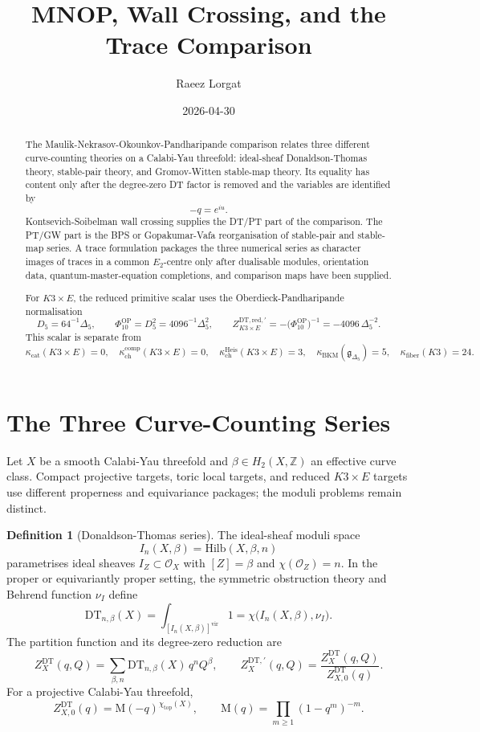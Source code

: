 \documentclass[11pt]{article}
\title{MNOP, Wall Crossing, and the Trace Comparison}
\author{Raeez Lorgat}
\date{2026-04-30}
\theoremstyle{definition}
\newtheorem{definition}[theorem]{Definition}
\providecommand{\Z}{\mathbb{Z}}
\providecommand{\cO}{\mathcal{O}}
\providecommand{\fg}{\mathfrak{g}}
\providecommand{\Hilb}{\mathrm{Hilb}}
\providecommand{\DT}{\mathrm{DT}}
\providecommand{\MM}{\mathrm{M}}
\providecommand{\vir}{\mathrm{vir}}
\providecommand{\red}{\mathrm{red}}
\providecommand{\topc}{\mathrm{top}}
\providecommand{\Etwo}{E_2}
\providecommand{\kcat}{\kappa_{\mathrm{cat}}}
\providecommand{\kchcomp}{\kappa_{\mathrm{ch}}^{\mathrm{comp}}}
\providecommand{\kchHeis}{\kappa_{\mathrm{ch}}^{\mathrm{Heis}}}
\providecommand{\kBKM}{\kappa_{\mathrm{BKM}}}
\providecommand{\kfib}{\kappa_{\mathrm{fiber}}}
\providecommand{\DeltaFive}{\Delta_5}
\providecommand{\PhiTen}{\Phi_{10}}
\providecommand{\Dfive}{D_5}
\begin{document}
\maketitle

\begin{abstract}
The Maulik-Nekrasov-Okounkov-Pandharipande comparison relates three
different curve-counting theories on a Calabi-Yau threefold: ideal-sheaf
Donaldson-Thomas theory, stable-pair theory, and Gromov-Witten stable-map
theory.  Its equality has content only after the degree-zero DT factor is
removed and the variables are identified by
\[
  -q=e^{iu}.
\]
Kontsevich-Soibelman wall crossing supplies the DT/PT part of the
comparison.  The PT/GW part is the BPS or Gopakumar-Vafa
reorganisation of stable-pair and stable-map series.  A trace
formulation packages the three numerical series as character images of
traces in a common \(\Etwo\)-centre only after dualisable modules,
orientation data, quantum-master-equation completions, and comparison
maps have been supplied.

For \(K3\times E\), the reduced primitive scalar uses the
Oberdieck-Pandharipande normalisation
\[
  \Dfive=64^{-1}\DeltaFive,\qquad
  \PhiTen^{\mathrm{OP}}=\Dfive^2=4096^{-1}\DeltaFive^2,\qquad
  Z^{\DT,\red,\prime}_{K3\times E}
  =-\bigl(\PhiTen^{\mathrm{OP}}\bigr)^{-1}
  =-4096\,\DeltaFive^{-2}.
\]
This scalar is separate from
\[
  \kcat(K3\times E)=0,\quad
  \kchcomp(K3\times E)=0,\quad
  \kchHeis(K3\times E)=3,\quad
  \kBKM(\fg_{\DeltaFive})=5,\quad
  \kfib(K3)=24.
\]
\end{abstract}

\tableofcontents

\section{The Three Curve-Counting Series}

Let \(X\) be a smooth Calabi-Yau threefold and
\(\beta\in H_2(X,\Z)\) an effective curve class.  Compact projective
targets, toric local targets, and reduced \(K3\times E\) targets use
different properness and equivariance packages; the moduli problems
remain distinct.

\begin{definition}[Donaldson-Thomas series]
The ideal-sheaf moduli space
\[
  I_n(X,\beta)=\Hilb(X,\beta,n)
\]
parametrises ideal sheaves \(I_Z\subset \cO_X\) with
\([Z]=\beta\) and \(\chi(\cO_Z)=n\).  In the proper or equivariantly
proper setting, the symmetric obstruction theory and Behrend function
\(\nu_I\) define
\[
  \DT_{n,\beta}(X)
  =
  \int_{[I_n(X,\beta)]^{\vir}}1
  =
  \chi\bigl(I_n(X,\beta),\nu_I\bigr).
\]
The partition function and its degree-zero reduction are
\[
  Z_X^{\DT}(q,Q)
  =
  \sum_{\beta,n}\DT_{n,\beta}(X)\,q^nQ^\beta,
  \qquad
  Z_X^{\DT,\prime}(q,Q)
  =
  \frac{Z_X^{\DT}(q,Q)}{Z_{X,0}^{\DT}(q)}.
\]
For a projective Calabi-Yau threefold,
\[
  Z_{X,0}^{\DT}(q)=\MM(-q)^{\chi_{\topc}(X)},\qquad
  \MM(q)=\prod_{m\ge1}(1-q^m)^{-m}.
\]
\end{definition}
\end{document}
